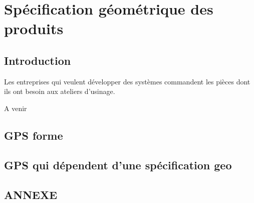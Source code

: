 \documentclass[
	11pt, %
	fleqn, %
	a4paper, %
]{LegrandOrangeBook}
\begin{document}

\chapterspaceabove{6.25cm} %
\chapterspacebelow{7.5cm} %


\chapter{Spécification géométrique des produits}
\section{Introduction}

Les entreprises qui veulent développer des systèmes commandent les pièces dont ils ont besoin aux ateliers d'usinage. 


A venir
\section{GPS forme}
\section{GPS qui dépendent d'une spécification geo}




\chapterspaceabove{6.25cm} %
\chapterspacebelow{7.5cm} %



	




\newpage
\section{ANNEXE}



{} %
\printindex %
\end{document}
